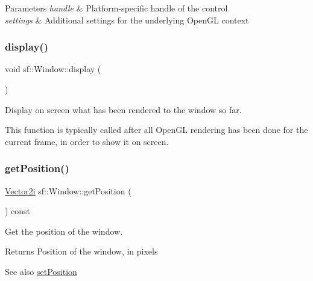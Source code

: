 \begin{DoxyParams}{Parameters}
{\em handle} & Platform-\/specific handle of the control \\
\hline
{\em settings} & Additional settings for the underlying Open\+GL context \\
\hline
\end{DoxyParams}
\mbox{\label{classsf_1_1_window_adabf839cb103ac96cfc82f781638772a}} 
\subsubsection{\texorpdfstring{display()}{display()}}
{\footnotesize\ttfamily void sf\+::\+Window\+::display (\begin{DoxyParamCaption}{ }\end{DoxyParamCaption})}



Display on screen what has been rendered to the window so far. 

This function is typically called after all Open\+GL rendering has been done for the current frame, in order to show it on screen. \mbox{\label{classsf_1_1_window_a420028b8e4d9baedcaaba7b2047b8cb3}} 
\subsubsection{\texorpdfstring{get\+Position()}{getPosition()}}
{\footnotesize\ttfamily \hyperlink{classsf_1_1_vector2}{Vector2i} sf\+::\+Window\+::get\+Position (\begin{DoxyParamCaption}{ }\end{DoxyParamCaption}) const}



Get the position of the window. 

\begin{DoxyReturn}{Returns}
Position of the window, in pixels
\end{DoxyReturn}
\begin{DoxySeeAlso}{See also}
\hyperlink{classsf_1_1_window_a6c4078bfbf61c29bfc4b4732ce764f17}{set\+Position} 
\end{DoxySeeAlso}
\mbox{\label{classsf_1_1_window_ae5b8065e92bbd0408e1fd8328e80d7d1}} 
